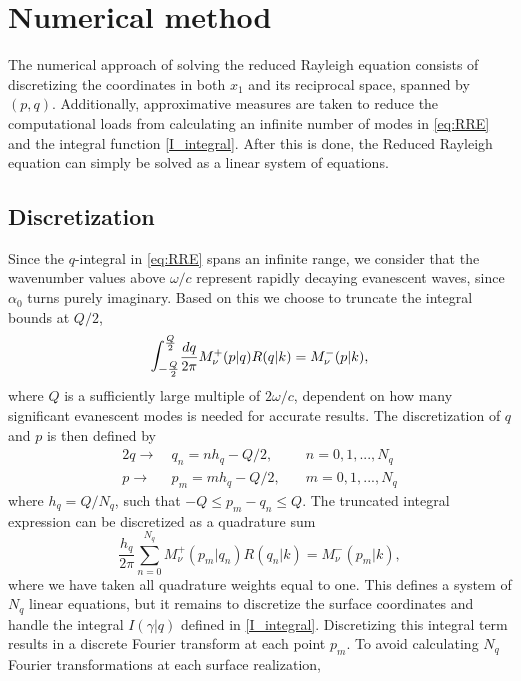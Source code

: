 \documentclass[../main.tex]{subfiles}
\begin{document}
\section{Numerical method}
The numerical approach of solving the reduced Rayleigh 
equation consists of discretizing the coordinates in both $x_1$
and its reciprocal space, spanned by $(p,q)$.
Additionally, approximative measures are taken to reduce the computational loads 
from calculating an infinite number of modes in \autoref{eq:RRE} and 
the integral function \autoref{I_integral}.
After this is done, 
the Reduced Rayleigh equation can simply be solved as a linear system of equations.


\subsection{Discretization}
Since the $q$-integral in \autoref{eq:RRE} spans an infinite range, 
we consider that the wavenumber values above $\omega/c$ 
represent rapidly decaying evanescent waves, 
since $\alpha_0$ turns purely imaginary.
Based on this we choose to truncate the integral bounds at $Q/2$,
\begin{equation}
    \mathlarger{\mathlarger{\int}}^{\frac{Q}{2}}_{-\frac{Q}{2}} \frac{dq}{2\pi} M_\nu^+(p|q)R(q|k) = M_\nu^-(p|k),
\end{equation}
where $Q$ is a sufficiently large multiple of $2\omega/c$, 
dependent on how many significant evanescent modes is needed for accurate results. 
The discretization of $q$ and $p$ is then defined by 
\begin{alignat*}{2}
    q \longrightarrow&\ q_n = nh_q - Q/2,\quad &n = 0,1,...,N_q\\
    p \longrightarrow&\ p_m = mh_q - Q/2,\quad &m = 0,1,...,N_q
\end{alignat*}
where $h_q = Q/N_q$, such that $-Q \leq p_m - q_n \leq Q$. 
The truncated integral expression can be discretized as a quadrature sum
\begin{equation} \label{eq:discrete_RRE}
    \frac{h_q}{2\pi} \sum^{N_q}_{n=0}
    M_\nu^+(p_m|q_n)R(q_n|k) = M_\nu^-(p_m|k),
\end{equation}
where we have taken all quadrature weights equal to one. 
This defines a system of $N_q$ linear equations, 
but it remains to discretize the surface coordinates 
and handle the integral $I(\gamma|q)$ defined in \autoref{I_integral}. 
Discretizing this integral term results in a discrete Fourier transform at each point $p_m$. 
To avoid calculating $N_q$ Fourier transformations at each surface realization, 
\end{document}
